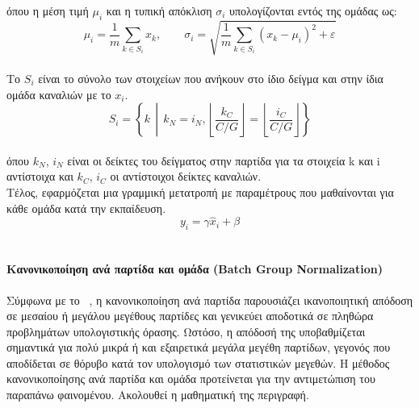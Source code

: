 \documentclass[12pt]{article}
\numberwithin{equation}{section}
\begin{document}
όπου η μέση τιμή \(\mu_i\) και η τυπική απόκλιση \(\sigma_i\) υπολογίζονται εντός της ομάδας ως:\\

\begin{equation}
\mu_i = \frac{1}{m} \sum_{k \in S_i} x_k, \qquad 
\sigma_i = \sqrt{\frac{1}{m} \sum_{k \in S_i} (x_k - \mu_i)^2 + \varepsilon}
\end{equation}\\

Το \(S_i\) είναι το σύνολο των στοιχείων που ανήκουν στο ίδιο δείγμα και στην ίδια ομάδα καναλιών με το \(x_i\). \\

\begin{equation}
S_i = \left\{ k \,\middle|\, k_N = i_N, \left\lfloor \frac{k_C}{C/G} \right\rfloor = \left\lfloor \frac{i_C}{C/G} \right\rfloor \right\}
\end{equation}\\

\noindent όπου \(k_N\), \(i_N\) είναι οι δείκτες του δείγματος στην παρτίδα για τα στοιχεία k και i αντίστοιχα και \(k_C\), \(i_C\) οι αντίστοιχοι δείκτες καναλιών.\\

\noindent Τέλος, εφαρμόζεται μια γραμμική μετατροπή με παραμέτρους που μαθαίνονται για κάθε ομάδα κατά την εκπαίδευση.\\

\begin{equation}
y_i = \gamma \hat{x}_i + \beta
\end{equation}\\

\paragraph{Kανονικοποίηση ανά παρτίδα και ομάδα (Batch Group Normalization)\\ [0.5cm]}

Σύμφωνα με το ~\cite{zhou2020batchgroupnormalization}, η κανονικοποίηση ανά παρτίδα παρουσιάζει ικανοποιητική απόδοση σε μεσαίου ή μεγάλου μεγέθους παρτίδες και γενικεύει αποδοτικά σε πληθώρα προβλημάτων υπολογιστικής όρασης. Ωστόσο, η απόδοσή της υποβαθμίζεται σημαντικά για πολύ μικρά ή και εξαιρετικά μεγάλα μεγέθη παρτίδων, γεγονός που αποδίδεται σε θόρυβο κατά τον υπολογισμό των στατιστικών μεγεθών. Η μέθοδος κανονικοποίησης ανά παρτίδα και ομάδα προτείνεται για την αντιμετώπιση του παραπάνω φαινομένου. Ακολουθεί η μαθηματική της περιγραφή.\\
\end{document}
